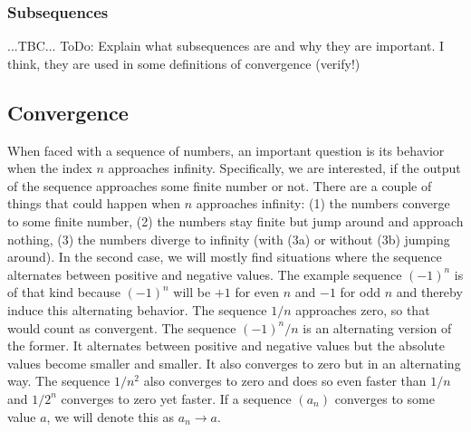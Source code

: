 


% 


\subsubsection{Subsequences} ...TBC... ToDo: Explain what subsequences are and why they are important. I think, they are used in some definitions of convergence (verify!)




\subsection{Convergence}
When faced with a sequence of numbers, an important question is its behavior when the index $n$ approaches infinity. Specifically, we are interested, if the output of the sequence approaches some finite number or not. There are a couple of things that could happen when $n$ approaches infinity: (1) the numbers converge to some finite number, (2) the numbers stay finite but jump around and approach nothing, (3) the numbers diverge to infinity (with (3a) or without (3b) jumping around). In the second case, we will mostly find situations where the sequence alternates between positive and negative values. The example sequence $(-1)^n$ is of that kind because $(-1)^n$ will be $+1$ for even $n$ and $-1$ for odd $n$ and thereby induce this alternating behavior. The sequence $1/n$ approaches zero, so that would count as convergent. The sequence $(-1)^n / n$ is an alternating version of the former. It alternates between positive and negative values but the absolute values become smaller and smaller. It also converges to zero but in an alternating way. The sequence $1/n^2$ also converges to zero and does so even faster than $1/n$ and $1/2^n$ converges to zero yet faster. If a sequence $(a_n)$ converges to some value $a$, we will denote this as $a_n \rightarrow a$.

